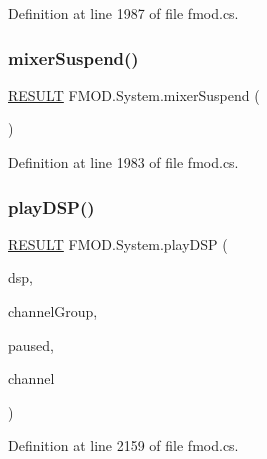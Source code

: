 Definition at line 1987 of file fmod.\+cs.

\mbox{\label{class_f_m_o_d_1_1_system_a441d25d4b895da6e81e0cf65845c984b}} 
\subsubsection{\texorpdfstring{mixer\+Suspend()}{mixerSuspend()}}
{\footnotesize\ttfamily \hyperlink{namespace_f_m_o_d_a305d1176ef3f8c8815861a60407ac33d}{R\+E\+S\+U\+LT} F\+M\+O\+D.\+System.\+mixer\+Suspend (\begin{DoxyParamCaption}{ }\end{DoxyParamCaption})}



Definition at line 1983 of file fmod.\+cs.

\mbox{\label{class_f_m_o_d_1_1_system_a2d6d9ea1fc61a43c52f56d8412bdbb16}} 
\subsubsection{\texorpdfstring{play\+D\+S\+P()}{playDSP()}}
{\footnotesize\ttfamily \hyperlink{namespace_f_m_o_d_a305d1176ef3f8c8815861a60407ac33d}{R\+E\+S\+U\+LT} F\+M\+O\+D.\+System.\+play\+D\+SP (\begin{DoxyParamCaption}\item[{\hyperlink{class_f_m_o_d_1_1_d_s_p}{D\+SP}}]{dsp,  }\item[{\hyperlink{class_f_m_o_d_1_1_channel_group}{Channel\+Group}}]{channel\+Group,  }\item[{bool}]{paused,  }\item[{out \hyperlink{class_f_m_o_d_1_1_channel}{Channel}}]{channel }\end{DoxyParamCaption})}



Definition at line 2159 of file fmod.\+cs.

\mbox{\label{class_f_m_o_d_1_1_system_a6900296cba46669a52211a58593bc52c}} 

